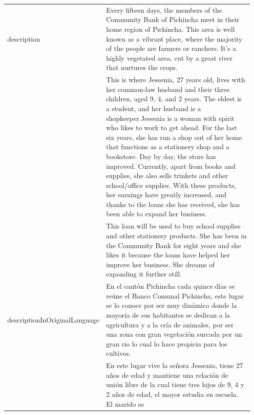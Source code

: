 \begin{longtable}{|p{}|p{}|}
	description                                     & Every fifteen days, the members of the Community Bank of
	Pichincha meet in their home region of Pichincha. This area is well
	known as a vibrant place, where the majority of the people are farmers
	or ranchers. It's a highly vegetated area, cut by a great river that
	nurtures the crops.                                                                                                                                             \\
	                                                & This is where Jessenia, 27 years old, lives with her common-law
	husband and their three children, aged 9, 4, and 2 years. The eldest is
	a student, and her husband is a shopkeeper.Jessenia is a woman with
	spirit who likes to work to get ahead. For the last six years, she has
	run a shop out of her home that functions as a stationery shop and a
	bookstore. Day by day, the store has improved. Currently, apart from
	books and supplies, she also sells trinkets and other school/office
	supplies. With these products, her earnings have greatly increased, and
	thanks to the loans she has received, she has been able to expand her
	business.                                                                                                                                                       \\
	                                                & This loan will be used to buy school supplies and other stationery
	products. She has been in the Community Bank for eight years and she
	likes it because the loans have helped her improve her business. She
	dreams of expanding it further still.                                                                                                                           \\
	descriptionInOriginalLanguage                   & En el cantón Pichincha cada quince días
	se reúne el Banco Comunal Pichincha, este lugar se lo conoce por ser muy
	dinámico donde la mayoría de sus habitantes se dedican a la agricultura
	y a la cría de animales, por ser una zona con gran vegetación surcada
	por un gran rio lo cual lo hace propicia para los cultivos.                                                                                                     \\
	                                                & En este lugar vive la señora Jessenia, tiene 27 años de edad y
	mantiene una relación de unión libre de la cual tiene tres hijos de 9, 4
	y 2 años de edad, el mayor estudia en escuela. El marido es

\end{longtable}
